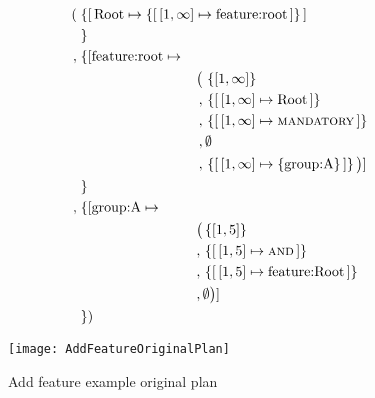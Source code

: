 \begin{align*}
  (&\; \{  \mapping{\text{Root}}{\set{\intervalmapping{1}{\forever}{\text{feature:root}}}} \\
   &\; \}\\
    ,&\; \{  [\text{feature:root} \mapsto \\
     & \hspace{30mm} \begin{aligned} \big(
          \, & \set{\interval{1}{\forever}} \\
       ,  \, & \set{\intervalmapping{1}{\forever}{\text{Root}}} \\
       ,  \, & \set{\intervalmapping{1}{\forever}{\mandatory}} \\
       ,  \, & \emptyset \\
     ,  \, & \set{\intervalmapping{1}{\forever}{\set{\text{group:A}}}} \big)]\\
  \end{aligned} \\
   &\; \}\\ 
          ,&\; \{ [\text{group:A} \mapsto \\
           & \hspace{30mm} \begin{aligned} \big(
                & \set{\interval{1}{5}} \\
                , \, & \set{\intervalmapping{1}{5}{\andtype}} \\
                , \, & \set{\intervalmapping{1}{5}{\text{feature:Root}}} \\
              , \, & \emptyset \big)] \\
            \end{aligned}  \\
   &\; \})
\end{align*}

\begin{figure}[h]
  \centering
  \texttt{[image: AddFeatureOriginalPlan]}
  \caption{Add feature example \textemdash{} original plan}
  \label{ex:add-feature-original-plan}
\end{figure}

